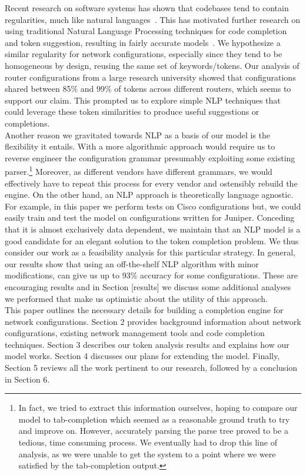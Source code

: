 Recent research on software systems has shown that codebases tend to contain regularities, much like natural languages~\cite{naturalness}. This has motivated further research on using traditional Natural Language Processing techniques for code completion and token suggestion, resulting in fairly accurate models~\cite{naturalness, raychev}. We hypothesize a similar regularity for network configurations, especially since they tend to be homogeneous by design, reusing the same set of keywords/tokens. Our analysis of router configurations from a large research university showed that configurations shared between 85\% and 99\% of tokens across different routers, which seems to support our claim. This prompted us to explore simple NLP techniques that could leverage these token similarities to produce useful suggestions or completions.\\

Another reason we gravitated towards NLP as a basis of our model is the flexibility it entails. With a more algorithmic approach would require us to reverse engineer the configuration grammar presumably exploiting some existing parser.\footnote{In fact, we tried to extract this information ourselves, hoping to compare our model to tab-completion which seemed as a reasonable ground truth to try and improve on. However, accurately parsing the parse tree proved to be a tedious, time consuming process. We eventually had to drop this line of analysis, as we were unable to get the system to a point where we were satisfied by the tab-completion output.} Moreover, as different vendors have different grammars, we would effectively have to repeat this process for every vendor and ostensibly rebuild the engine. On the other hand, an NLP approach is theoretically language agnostic. For example, in this paper we perform tests on Cisco configurations but, we could easily train and test the model on configurations written for Juniper. Conceding that it is almost exclusively data dependent, we maintain that an NLP model is a good candidate for an elegant solution to the token completion problem. We thus consider our work as a feasibility analysis for this particular strategy. In general, our results show that using an off-the-shelf NLP algorithm with minor modifications, can give us up to 93\% accuracy for some configurations. These are encouraging results and in Section [results] we discuss some additional analyses we performed that make us optimistic about the utility of this approach.\\

This paper outlines the necessary details for building a completion engine for network configurations. Section 2 provides background information about network configurations, existing network management tools and code completion techniques. Section 3 describes our token analysis results and explains how our model works. Section 4 discusses our plans for extending the model. Finally, Section 5 reviews all the work pertinent to our research, followed by a conclusion in Section 6.

